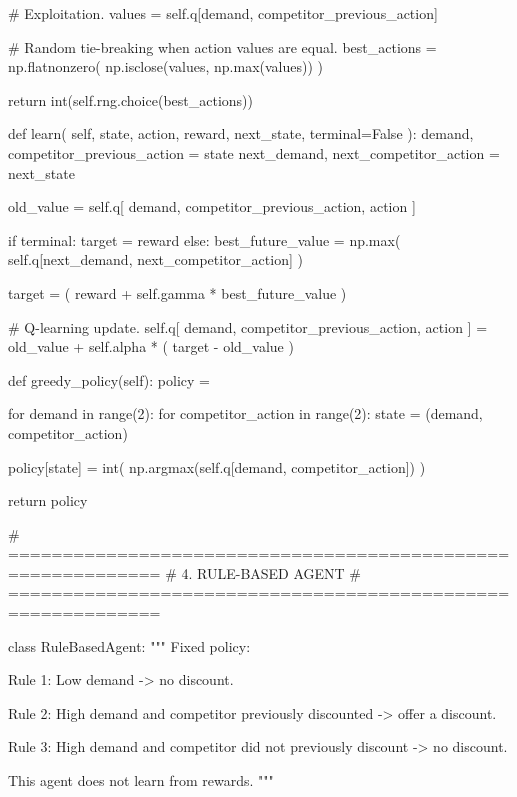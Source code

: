         # Exploitation.
        values = self.q[demand, competitor_previous_action]

        # Random tie-breaking when action values are equal.
        best_actions = np.flatnonzero(
            np.isclose(values, np.max(values))
        )

        return int(self.rng.choice(best_actions))

    def learn(
        self,
        state,
        action,
        reward,
        next_state,
        terminal=False
    ):
        demand, competitor_previous_action = state
        next_demand, next_competitor_action = next_state

        old_value = self.q[
            demand, competitor_previous_action, action
        ]

        if terminal:
            target = reward
        else:
            best_future_value = np.max(
                self.q[next_demand, next_competitor_action]
            )

            target = (
                reward + self.gamma * best_future_value
            )

        # Q-learning update.
        self.q[
            demand, competitor_previous_action, action
        ] = old_value + self.alpha * (
            target - old_value
        )

    def greedy_policy(self):
        policy = {}

        for demand in range(2):
            for competitor_action in range(2):
                state = (demand, competitor_action)

                policy[state] = int(
                    np.argmax(self.q[demand, competitor_action])
                )

        return policy


# ============================================================
# 4. RULE-BASED AGENT
# ============================================================

class RuleBasedAgent:
    """
    Fixed policy:

    Rule 1:
        Low demand -> no discount.

    Rule 2:
        High demand and competitor previously discounted
        -> offer a discount.

    Rule 3:
        High demand and competitor did not previously discount
        -> no discount.

    This agent does not learn from rewards.
    """


